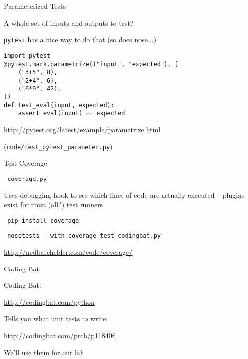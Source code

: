 \documentclass{beamer}
\begin{document}
\begin{frame}[fragile]{Parameterized Tests}

{\Large A whole set of inputs and outputs to test?}

\vfill
{\Large \verb|pytest| has a nice way to do that (so does nose...)}

\begin{verbatim}
import pytest
@pytest.mark.parametrize(("input", "expected"), [
    ("3+5", 8),
    ("2+4", 6),
    ("6*9", 42),
])
def test_eval(input, expected):
    assert eval(input) == expected
\end{verbatim}

\url{http://pytest.org/latest/example/parametrize.html}

\vfill
(\verb|code/test_pytest_parameter.py|)
\end{frame} 

\begin{frame}[fragile]{Test Coverage}

{\LARGE \verb|￼coverage.py |}

\vfill
{\Large Uses debugging hook to see which lines of code are actually executed
-- plugins exist for most (all?) test runners}

\vfill
{\Large \verb|￼pip install coverage |}

\vfill
{\Large \verb|￼nosetests --with-coverage test_codingbat.py|}

\vfill
\url{http://nedbatchelder.com/code/coverage/}
\end{frame}

\begin{frame}[fragile]{Coding Bat}

{\LARGE Coding Bat:}

\url{http://codingbat.com/python}


\vfill
{\Large Tells you what unit tests to write:}

\url{http://codingbat.com/prob/p118406}

\vfill
{\Large We'll use them for our lab}

\end{frame}
\end{document}
